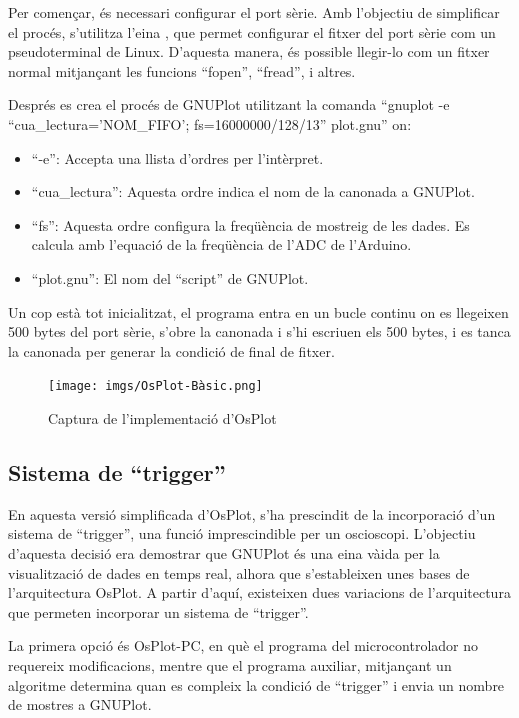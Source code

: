 \documentclass{tfgitic}[2023/06/30]
\begin{document}
\newpage

Per començar, és necessari configurar el port sèrie. Amb l'objectiu de
simplificar el procés, s'utilitza l'eina \cite[stty]{stty}, que permet
configurar el fitxer del port sèrie com un pseudoterminal de
Linux. D'aquesta manera, és possible llegir-lo com un fitxer normal
mitjançant les funcions ``fopen'', ``fread'', i altres.

Després es crea el procés de GNUPlot utilitzant la comanda ``gnuplot
-e ``cua\_lectura='NOM\_FIFO'; fs=16000000/128/13'' plot.gnu'' on:
\begin{itemize}
      \item ``-e'': Accepta una llista d'ordres per l'intèrpret.
      \item ``cua\_lectura'': Aquesta ordre indica el nom de la
        canonada a GNUPlot.
      \item ``fs'': Aquesta ordre configura la freqüència de mostreig
        de les dades. Es calcula amb l'equació de la freqüència de
        l'ADC de l'Arduino.
      \item ``plot.gnu'': El nom del ``script'' de GNUPlot.
\end{itemize}

Un cop està tot inicialitzat, el programa entra en un bucle continu on
es llegeixen 500 bytes del port sèrie, s'obre la canonada i s'hi
escriuen els 500 bytes, i es tanca la canonada per generar la condició
de final de fitxer.

\begin{figure}[h]
  \centering
  \texttt{[image: imgs/OsPlot-Bàsic.png]}
  \caption{Captura de l'implementació d'OsPlot}
\end{figure}

\subsection{Sistema de ``trigger''}

En aquesta versió simplificada d'OsPlot, s'ha prescindit de la
incorporació d'un sistema de ``trigger'', una funció imprescindible
per un osci\lgem oscopi. L'objectiu d'aquesta decisió era demostrar
que GNUPlot és una eina và\lgem ida per la visualització de dades en
temps real, alhora que s'estableixen unes bases de l'arquitectura
OsPlot. A partir d'aquí, existeixen dues variacions de l'arquitectura
que permeten incorporar un sistema de ``trigger''.

La primera opció és OsPlot-PC, en què el programa del microcontrolador
no requereix modificacions, mentre que el programa auxiliar,
mitjançant un algoritme determina quan es compleix la condició de
``trigger'' i envia un nombre de mostres a GNUPlot.
\end{document}

